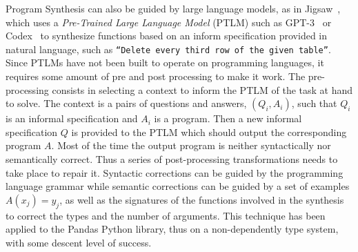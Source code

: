 \documentclass[]{report}
\begin{document}
Program Synthesis can also be guided by large language models, as in
Jigsaw~\cite{Jain2022}, which uses a \emph{Pre-Trained Large Language
  Model} (PTLM) such as GPT-3~\cite{Brown2020} or
Codex~\cite{Chen2021} to synthesize functions based on an inform
specification provided in natural language, such as \texttt{``Delete
  every third row of the given table''}.  Since PTLMs have not been
built to operate on programming languages, it requires some amount of
pre and post processing to make it work.  The pre-processing consists
in selecting a context to inform the PTLM of the task at hand to
solve.  The context is a pairs of questions and answers, $(Q_i, A_i)$,
such that $Q_i$ is an informal specification and $A_i$ is a program.
Then a new informal specification $Q$ is provided to the PTLM which
should output the corresponding program $A$.  Most of the time the
output program is neither syntactically nor semantically correct.
Thus a series of post-processing transformations needs to take place
to repair it.  Syntactic corrections can be guided by the programming
language grammar while semantic corrections can be guided by a set of
examples $A(x_j)=y_j$, as well as the signatures of the functions
involved in the synthesis to correct the types and the number of
arguments.  This technique has been applied to the Pandas Python
library, thus on a non-dependently type system, with some descent
level of success.
\end{document}
